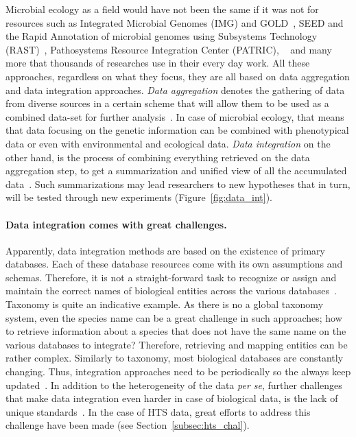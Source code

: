       Microbial ecology as a field would have not been the same if it was not 
      for resources such as 
      Integrated Microbial Genomes (IMG) and GOLD~\cite{chen2021img}, 
      SEED and the Rapid Annotation of microbial genomes using Subsystems Technology (RAST)~\cite{overbeek2014seed}, 
      Pathosystems Resource Integration Center (PATRIC),
      ~\cite{zhulin2015databases}
      and many more that thousands of researches use in their every day work. 
      All these approaches, regardless on what they focus, they are all based on data aggregation and data integration approaches. 
      \textit{Data aggregation} denotes the gathering of data from diverse sources
      in a certain scheme that will allow them to be used as a combined data-set for 
      further analysis~\cite{simpson2010secure}. 
      In case of microbial ecology, that means that data focusing on the genetic 
      information can be combined with phenotypical data or even with environmental and 
      ecological data.
      \textit{Data integration} on the other hand, is the process of combining everything
      retrieved on the data aggregation step, 
      to get a summarization and unified view of all the accumulated data~\cite{schneider2012teaching}.
      Such summarizations may lead researchers to new hypotheses that 
      in turn, will be tested through new experiments (Figure~\ref{fig:data_int}).


      \paragraph{Data integration comes with great challenges.}

      Apparently, data integration methods are based on the existence of primary databases. 
      Each of these database resources come with its own assumptions and schemas. 
      Therefore, it is not a straight-forward task to recognize or assign and maintain 
      the correct names of biological entities across the various databases~\cite{stein2003integrating}.
      Taxonomy is quite an indicative example. 
      As there is no a global taxonomy system, even the species name can be a 
      great challenge in such approaches; how to retrieve information about a species
      that does not have the same name on the various databases to integrate? 
      Therefore, retrieving and mapping entities can be rather complex.  
      Similarly to taxonomy, most biological databases are constantly changing. 
      Thus, integration approaches need to be periodically so the always keep updated~\cite{stein2003integrating}.
      In addition to the heterogeneity of the data \textit{per se},
      further challenges that make data integration even harder in case of biological data,
      is the lack of unique standards~\cite{triplet2011systems}.
      In the case of HTS data, great efforts to address this challenge have been 
      made (see Section~\ref{subsec:hts_chal}).

